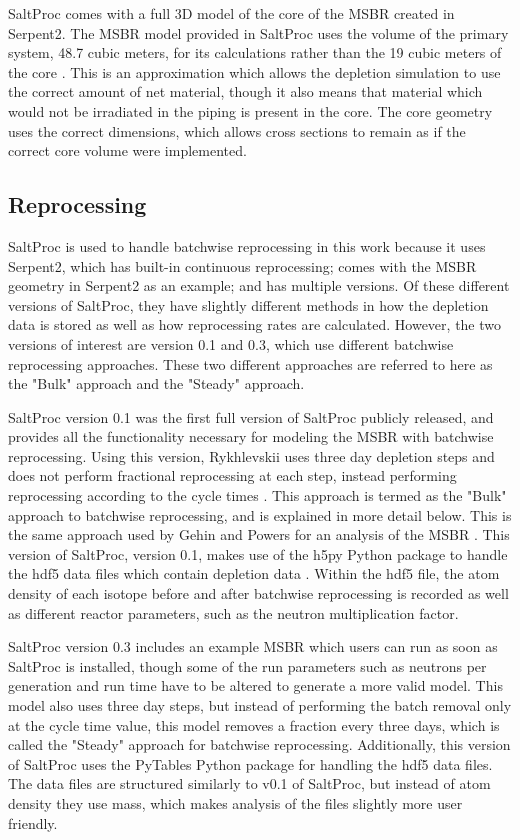 SaltProc comes with a full 3D model of the core of the MSBR created in Serpent2.
The MSBR model provided in SaltProc uses the volume of the primary system, 48.7 cubic meters, for its calculations rather than the 19 cubic meters of the core \cite{rykhlevskii_modeling_2019}.
This is an approximation which allows the depletion simulation to use the correct amount of net material, though it also means that material which would not be irradiated in the piping is present in the core.
The core geometry uses the correct dimensions, which allows cross sections to remain as if the correct core volume were implemented.

\subsection{Reprocessing}
\label{s:SP-repr}

SaltProc is used to handle batchwise reprocessing in this work because it uses Serpent2, which has built-in continuous reprocessing; comes with the MSBR geometry in Serpent2 as an example; and has multiple versions.
Of these different versions of SaltProc, they have slightly different methods in how the depletion data is stored as well as how reprocessing rates are calculated.
However, the two versions of interest are version 0.1 and 0.3, which use different batchwise reprocessing approaches.
These two different approaches are referred to here as the "Bulk" approach and the "Steady" approach.

SaltProc version 0.1 was the first full version of SaltProc publicly released, and provides all the functionality necessary for modeling the MSBR with batchwise reprocessing.
Using this version, Rykhlevskii uses three day depletion steps and does not perform fractional reprocessing at each step, instead performing reprocessing according to the cycle times \cite{rykhlevskii_advanced_2018}.
This approach is termed as the "Bulk" approach to batchwise reprocessing, and is explained in more detail below. This is the same approach used by Gehin and Powers for an analysis of the MSBR \cite{gehin_liquid_2016}.
This version of SaltProc, version 0.1, makes use of the h5py Python package to handle the hdf5 data files which contain depletion data \cite{collette_python_hdf5_2014}. Within the hdf5 file, the atom density of each isotope before and after batchwise reprocessing is recorded as well as different reactor parameters, such as the neutron multiplication factor.

SaltProc version 0.3 includes an example MSBR which users can run as soon as SaltProc is installed, though some of the run parameters such as neutrons per generation and run time have to be altered to generate a more valid model.
This model also uses three day steps, but instead of performing the batch removal only at the cycle time value, this model removes a fraction every three days, which is called the "Steady" approach for batchwise reprocessing.
Additionally, this version of SaltProc uses the PyTables Python package for handling the hdf5 data files. The data files are structured similarly to v0.1 of SaltProc, but instead of atom density they use mass, which makes analysis of the files slightly more user friendly.

